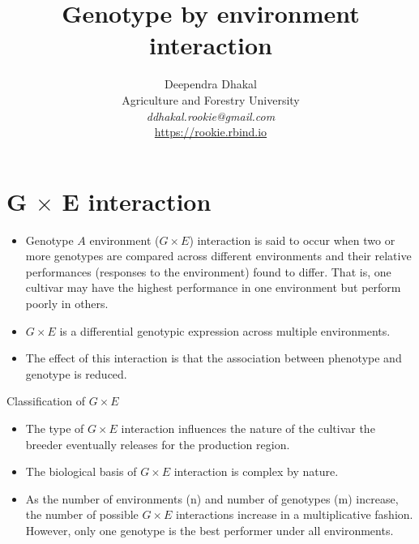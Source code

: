 \documentclass[11pt,dvipsnames,ignorenonframetext,aspectratio=169]{beamer}
\title[]{Genotype by environment interaction}
\author[
        Deependra Dhakal\\
Agriculture and Forestry University\\
\textit{ddhakal.rookie@gmail.com}\\
\url{https://rookie.rbind.io}
    ]{Deependra Dhakal\\
Agriculture and Forestry University\\
\textit{ddhakal.rookie@gmail.com}\\
\url{https://rookie.rbind.io}}
\date[
      
  ]{
    }
\providecommand{\tightlist}{%
  \setlength{\itemsep}{0pt}\setlength{\parskip}{0pt}}
\begin{document}
  \begin{frame}[plain]
  \titlepage
  \end{frame}



\hypertarget{g-times-e-interaction}{%
\section{\texorpdfstring{G \(\times\) E
interaction}{G \textbackslash times E interaction}}\label{g-times-e-interaction}}

\begin{frame}{}
\protect\hypertarget{section}{}
\begin{itemize}
\tightlist
\item
  Genotype \(A\) environment (\(G \times E\)) interaction is said to
  occur when two or more genotypes are compared across different
  environments and their relative performances (responses to the
  environment) found to differ. That is, one cultivar may have the
  highest performance in one environment but perform poorly in others.
\item
  \(G \times E\) is a differential genotypic expression across multiple
  environments.
\item
  The effect of this interaction is that the association between
  phenotype and genotype is reduced.
\end{itemize}
\end{frame}

\begin{frame}{Classification of \(G \times E\)}
\protect\hypertarget{classification-of-g-times-e}{}
\begin{itemize}
\tightlist
\item
  The type of \(G \times E\) interaction influences the nature of the
  cultivar the breeder eventually releases for the production region.
\item
  The biological basis of \(G \times E\) interaction is complex by
  nature.
\item
  As the number of environments (n) and number of genotypes (m)
  increase, the number of possible \(G \times E\) interactions increase
  in a multiplicative fashion. However, only one genotype is the best
  performer under all environments.
\end{itemize}
\end{frame}
\end{document}

